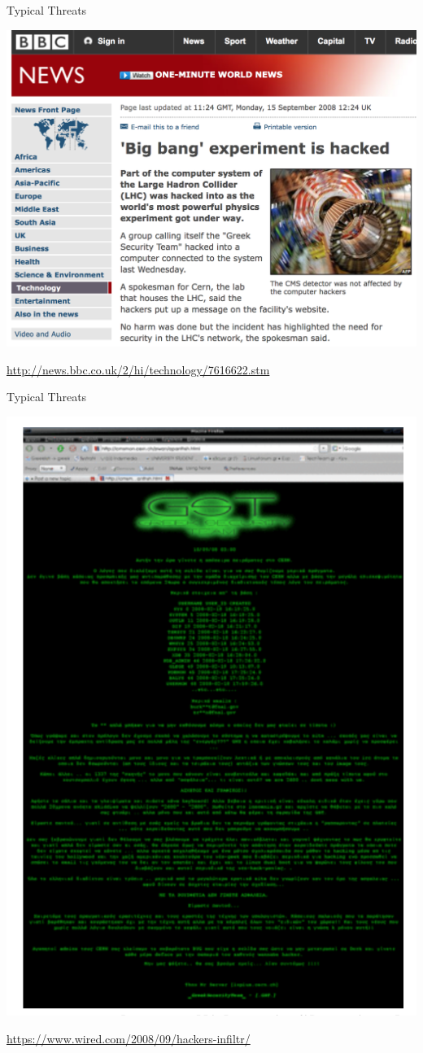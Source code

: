 \documentclass{beamer}
\begin{document}
\begin{frame}{Typical Threats}
  \begin{center}
		\includegraphics[width=0.65\linewidth]{bbc.png} \newline
        {\small \url{http://news.bbc.co.uk/2/hi/technology/7616622.stm} \par}
  \end{center}
\end{frame}

\begin{frame}{Typical Threats}
  \begin{center}
      \includegraphics[width=0.4\linewidth]{greek-attack.png}  \newline
  	 {\small \url{https://www.wired.com/2008/09/hackers-infiltr/} \par}
  \end{center}
\end{frame}
\end{document}
